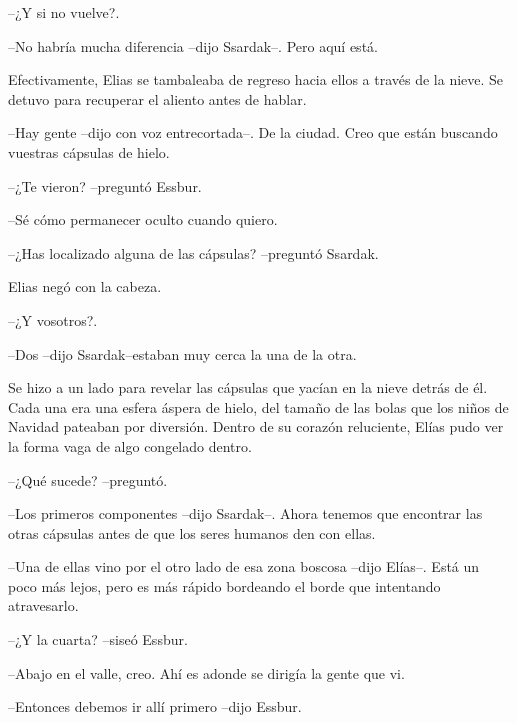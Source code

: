 --¿Y si no vuelve?.



--No habría mucha diferencia --dijo Ssardak--. Pero aquí está.



Efectivamente, Elias se tambaleaba de regreso hacia ellos a través de la nieve. Se detuvo para recuperar el aliento antes de hablar. 


--Hay gente --dijo con voz entrecortada--. De la ciudad. Creo que están buscando vuestras cápsulas de hielo.



--¿Te vieron? --preguntó Essbur.



--Sé cómo permanecer oculto cuando quiero.



--¿Has localizado alguna de las cápsulas? --preguntó Ssardak.



Elias negó con la cabeza. 


--¿Y vosotros?.



--Dos --dijo Ssardak--estaban muy cerca la una de la otra.



Se hizo a un lado para revelar las cápsulas que yacían en la nieve detrás de él. Cada una era una esfera áspera de hielo, del tamaño de las bolas que los niños de Navidad pateaban por diversión. Dentro de su corazón reluciente, Elías pudo ver la forma vaga de algo congelado dentro.



--¿Qué sucede? --preguntó.



--Los primeros componentes --dijo Ssardak--. Ahora tenemos que encontrar las otras cápsulas  antes de que los seres humanos den con ellas.



--Una de ellas vino por el otro lado de esa zona boscosa --dijo Elías--. Está un poco más lejos, pero es más rápido bordeando el borde que intentando atravesarlo.


--¿Y la cuarta? --siseó Essbur.



--Abajo en el valle, creo. Ahí es adonde se dirigía la gente que vi.



--Entonces debemos ir allí primero --dijo Essbur.



